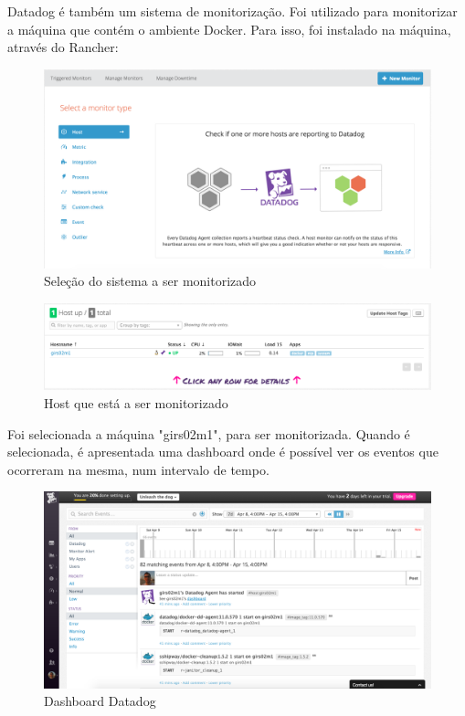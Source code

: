 \documentclass[pdftex,12pt,a4paper]{report}
\begin{document}
Datadog é também um sistema de monitorização. Foi utilizado para monitorizar a máquina que contém o ambiente Docker. Para isso, foi instalado na máquina, através do Rancher:

\begin{figure}[!htb]
\center
 \includegraphics[width=150mm,scale=1]{imagens/select_monitor_to_trigger.png}
 \caption{Seleção do sistema a ser monitorizado}
 \label{fig:select}
\end{figure}

\begin{figure}[!htb]
\center
 \includegraphics[width=150mm,scale=1]{imagens/hosts.png}
 \caption{Host que está a ser monitorizado}
 \label{fig:hots}
\end{figure}

Foi selecionada a máquina "girs02m1", para ser monitorizada. Quando é selecionada, é apresentada uma dashboard onde é possível ver os eventos que ocorreram na mesma, num intervalo de tempo.

\begin{figure}[!htb]
\center
 \includegraphics[width=150mm,scale=1]{imagens/datadog_dashboard.png}
 \caption{Dashboard Datadog}
 \label{fig:dashboard}
\end{figure}
\newpage
\end{document}
